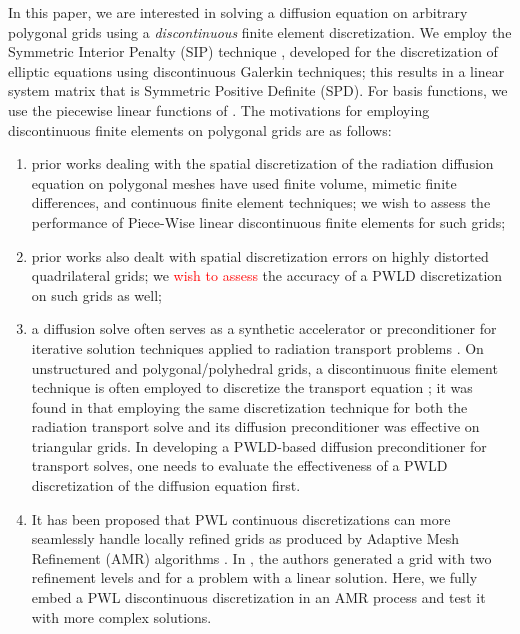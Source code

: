 \documentclass[preprint,10pt]{elsarticle}
\newcommand{\tcr}[1]{\textcolor{red}{#1}}
\begin{document}
In this paper, we are interested in solving a diffusion equation on arbitrary polygonal
grids using a {\em discontinuous} finite element discretization. We employ the
Symmetric Interior Penalty (SIP) technique \cite{Arnold1982,DouglasN.Arnold2002,Kanschat2007}, 
developed for the discretization of elliptic equations using discontinuous Galerkin techniques;
this results in a linear system matrix that is Symmetric Positive Definite (SPD). For basis functions,
we use the piecewise linear functions of \cite{BaileyAdams2008}.
The motivations for employing discontinuous finite elements on polygonal grids are as follows: 
\begin{enumerate}
\item 
	prior works dealing with the spatial discretization of the radiation diffusion equation on polygonal meshes 
	have used finite volume, mimetic finite differences, and continuous finite element techniques;  
	we wish to assess the performance of Piece-Wise linear discontinuous finite elements for such grids;
\item prior works also dealt with spatial discretization errors on highly distorted quadrilateral grids; 
  we \tcr{wish to assess} the accuracy of a PWLD discretization on such grids as well; 
\item a diffusion solve often serves as a synthetic accelerator or preconditioner for 
  iterative solution techniques applied to radiation transport problems
	\cite{AdamsLarsen2002,JamesS.Warsa2004}. On unstructured and polygonal/polyhedral grids,
	a discontinuous finite element technique is often employed to discretize the transport equation 
	\cite{Wareing_McGhee_Morel_Pautz_DGFEM2001,Warsa2008_CDFEM,Ragusa_Wang_NSE_2009,Bailey_MC2011,Ragusa_Wang_JCP_2011};
	it was found in \cite{Ragusa_Wang_NSE_2010} that employing the same discretization technique for both 
	the radiation transport solve and its diffusion preconditioner was effective on triangular grids.
	In developing a PWLD-based diffusion preconditioner for transport solves, one needs to 
	evaluate the effectiveness of a PWLD discretization of the diffusion equation first.  
\item It has been proposed that PWL continuous discretizations can
  more seamlessly handle locally refined grids as produced by Adaptive Mesh Refinement (AMR) algorithms
	\cite{BaileyAdams2008}. In \cite{BaileyAdams2008}, the authors generated a grid with two refinement levels
	and for a problem with a linear solution. Here, we fully embed a PWL discontinuous discretization
	in an AMR process and test it with more complex solutions.
\end{enumerate}
\end{document}
